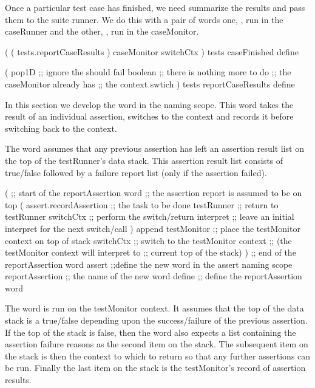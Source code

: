 
Once a particular test case has finished, we need summarize the results 
and pass them to the suite runner. We do this with a pair of words one, 
, run in the caseRunner and the other, 
, run in the caseMonitor. 

\startJoylolCode
(
  ( tests.reportCaseResults )
  caseMonitor
  switchCtx
)
tests
caseFinished
define
\stopJoylolCode

\startJoylolCode
(
  pop1D   ;; ignore the should fail boolean
          ;; there is nothing more to do
          ;; the caseMonitor already has
          ;; the context swtich 
)
tests
reportCaseResults
define
\stopJoylolCode

\stopTestSuite


In this section we develop the  word in the 
 naming scope. This word takes the result of an individual 
assertion, switches to the  context and records it 
before switching back to the  context. 

The  word assumes that any previous assertion has 
left an assertion result list on the top of the testRunner's data stack. 
This assertion result list consists of true/false followed by a failure 
report list (only if the assertion failed). 

\startJoylolCode
(               ;; start of the reportAssertion word
                ;; the assertion report is assumed to be on top
  (
    assert.recordAssertion  ;; the task to be done
    testRunner  ;; return to testRunner
    switchCtx   ;; perform the switch/return
    interpret   ;; leave an initial interpret for the next switch/call
  )
  append
  testMonitor   ;; place the testMonitor context on top of stack
  switchCtx     ;; switch to the testMonitor context
                ;; (the testMonitor context will interpret to
                ;;  current top of the stack)
)               ;; end of the reportAssertion word
assert          ;;define the new word in the assert naming scope
reportAssertion ;; the name of the new word
define          ;; define the reportAssertion word
\stopJoylolCode
\stopTestSuite


The  word is run on the testMonitor context. It 
assumes that the top of the data stack is a true/false depending upon the 
success/failure of the previous assertion. If the top of the stack is 
false, then the  word also expects a list containing 
the assertion failure reasons as the second item on the stack. The 
subsequent item on the stack is then the context to which to return so 
that any further assertions can be run. Finally the last item on the stack 
is the testMonitor's record of assertion results. 


